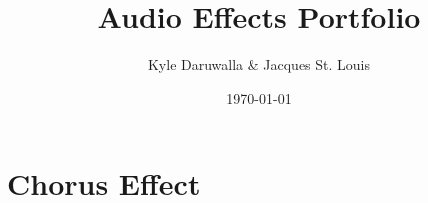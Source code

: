 \documentclass{article}
\title{Audio Effects Portfolio}
\author{Kyle Daruwalla \& Jacques St. Louis}
\date{\today}
\begin{document}
\maketitle

\section{Chorus Effect}

\end{document}

